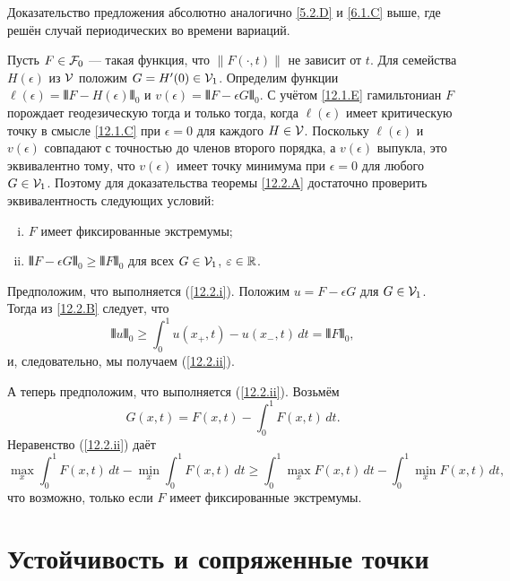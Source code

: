 Доказательство предложения абсолютно аналогично \ref{5.2.D} и \ref{6.1.C} выше, где решён случай периодических во времени вариаций.

Пусть $F\in\mathcal{F}_0$ --- такая функция, что $\|F(\cdot, t)\|$ не зависит от $t$.
Для семейства $H(\epsilon)$ из $\mathcal{V}$ положим $G = H'(0)\in\mathcal{V}_1$.
Определим функции $\ell(\epsilon) = \VERT F - H(\epsilon)\VERT_0$ и $v(\epsilon) = \VERT F - \epsilon G\VERT_0$.
С учётом \ref{12.1.E} гамильтониан $F$ порождает геодезическую тогда и только тогда, когда $\ell(\epsilon)$ имеет критическую точку в смысле \ref{12.1.C} при $\epsilon= 0$ для каждого $H\in\mathcal{V}$.
Поскольку $\ell(\epsilon)$ и $v(\epsilon)$ совпадают с точностью до членов второго порядка, а $v(\epsilon)$ выпукла, это эквивалентно тому, что $v(\epsilon)$ имеет точку минимума при $\epsilon= 0$ для любого $G\in\mathcal{V}_1$.
Поэтому для доказательства теоремы \ref{12.2.A} достаточно проверить эквивалентность следующих условий:
\begin{enumerate}[(i)]
\item\label{12.2.i} $F$ имеет фиксированные экстремумы;
\item\label{12.2.ii} $\VERT F - \epsilon G\VERT_0 \ge \VERT F\VERT_0$ для всех $G\in\mathcal{V}_1$, $\varepsilon\in\mathbb{R}$.
\end{enumerate} 

Предположим, что выполняется (\ref{12.2.i}).
Положим 
$u=F-\epsilon G$ для $G\in \mathcal{V}_1$.
Тогда из \ref{12.2.B} следует, что 
\[\VERT u\VERT_0 \ge \int_0^1 u(x_+,t)-u(x_-,t)\,dt=\VERT F\VERT_0,\]
и, следовательно, мы получаем (\ref{12.2.ii}).

А теперь предположим, что выполняется (\ref{12.2.ii}).
Возьмём 
\[G(x, t) = F(x, t) - \int_0^1F(x,t)\,dt.\]
Неравенство (\ref{12.2.ii}) даёт 
\[
\max_x\!\int_0^1 F(x, t)\,dt- \min_x\!\int_0^1 F(x, t)\,dt
\ge
\int_0^1 \max_xF(x, t)\,dt-\! \int_0^1\min_x F(x, t)\,dt,
\]
что возможно, только если $F$ имеет фиксированные экстремумы.
\qeds


\section{Устойчивость и сопряженные точки}

